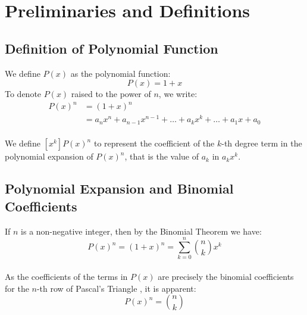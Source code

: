 \documentclass{article}
\theoremstyle{plain}
\theoremstyle{definition}
\begin{document}
\section{Preliminaries and Definitions}

\subsection{Definition of Polynomial Function}
We define $P(x)$ as the polynomial function:
\begin{equation}
P(x) = 1 + x
\end{equation}
To denote $P(x)$ raised to the power of $n$, we write:
\begin{align*}
P(x)^{n} &= (1 + x)^{n} \\
&= a_n x^n + a_{n-1} x^{n-1} + \ldots + a_k x^k + \ldots + a_1 x + a_0
\end{align*}
\\
We define $[x^k] P(x)^{n}$ to represent the coefficient of the $k$-th degree term in the polynomial expansion of $P(x)^{n}$, that is the value of $a_k$ in $a_k x^k$.

\subsection{Polynomial Expansion and Binomial Coefficients}

If $n$ is a non-negative integer, then by the Binomial Theorem \cite{stewart2007calculus} we have:
\begin{equation}
P(x)^{n} = (1 + x)^{n} = \sum_{k=0}^{n} \binom{n}{k} x^{k}
\end{equation}
\\
As the coefficients of the terms in $P(x)$ are precisely the binomial coefficients for the $n$-th row of Pascal's Triangle \cite{rosen2011discrete}, it is apparent:
\begin{equation}
[x^k] P(x)^{n} = \binom{n}{k}
\end{equation}
\end{document}
